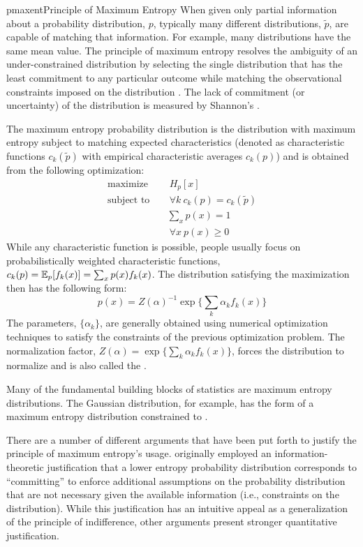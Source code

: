 \documentclass[9pt]{article}
\begin{document}
\begin{topic}{pmaxent}{Principle of Maximum Entropy}
When given only partial information about a probability distribution, $p$, typically many different distributions, $\tilde{p}$, are capable of matching that information. For example, many distributions have the same mean value. The principle of maximum entropy resolves the ambiguity of an under-constrained distribution by selecting the single distribution that has the least commitment to any particular outcome while matching the observational constraints imposed on the distribution \citep{Jaynes1957Information}. The lack of commitment (or uncertainty) of the distribution is measured by Shannon's .

The maximum entropy probability distribution is the distribution with maximum entropy subject to matching expected characteristics (denoted as characteristic functions $c_k(\tilde{p})$ with empirical characteristic averages $c_k(p)$) and is obtained from the following optimization:
\[
\begin{split}
\text{maximize} & \quad \: H_p[x]\\
\text{subject to} & \quad \: \forall k \: c_k(p) = c_k(\tilde{p})\\
& \quad \sum_x p(x) = 1\\
& \quad \: \forall x \: p(x) \ge 0
\end{split}
\]
While any characteristic function is possible, people usually focus on probabilistically weighted characteristic functions, $c_k(p) = \operatorname{\mathbb{E}}_p[f_k(x)] =  \sum_{x} p(x)f_k(x)$. The distribution satisfying the maximization then has the following form:
\[
p(x) = Z(\alpha)^{-1} \exp \bigg\{\sum_{k} \alpha_k f_k(x)\bigg\}
\]
The parameters, $\{\alpha_k\}$, are generally obtained using numerical optimization techniques to satisfy the constraints of the previous optimization problem. The normalization factor, $Z(\alpha) = \exp \big\{\sum_{k} \alpha_k f_k(x)\big\}$, forces the distribution to normalize and is also called the .

Many of the fundamental building blocks of statistics are maximum entropy distributions. The Gaussian distribution, for example, has the form of a maximum entropy distribution constrained to . 

There are a number of different arguments that have been put forth to justify the principle of maximum entropy's usage. \cite{Jaynes1957Information} originally employed an information-theoretic justification that a lower entropy probability distribution corresponds to ``committing'' to enforce additional assumptions on the probability distribution that are not necessary given the available information (i.e., constraints on the distribution). While this justification has an intuitive appeal as a generalization of the principle of indifference, other arguments present stronger quantitative justification.


\end{topic}
\end{document}
